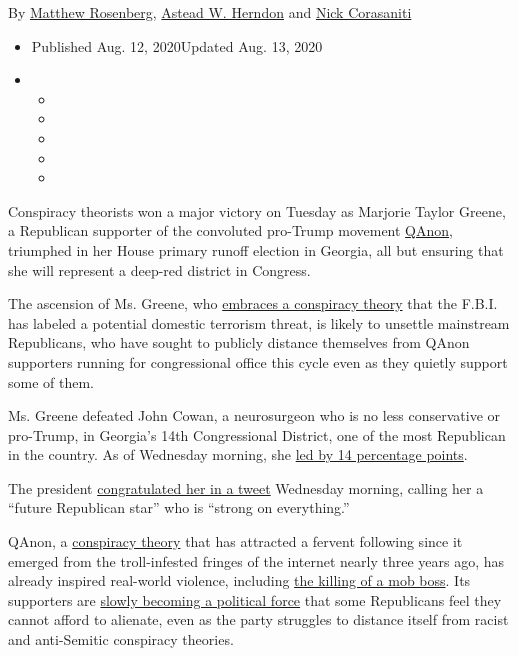 By
\href{https://www.nytimes3xbfgragh.onion/by/matthew-rosenberg}{Matthew
Rosenberg},
\href{https://www.nytimes3xbfgragh.onion/by/astead-w-herndon}{Astead W.
Herndon} and
\href{https://www.nytimes3xbfgragh.onion/by/nick-corasaniti}{Nick
Corasaniti}

\begin{itemize}
\item
  Published Aug. 12, 2020Updated Aug. 13, 2020
\item
  \begin{itemize}
  \item
  \item
  \item
  \item
  \item
  \end{itemize}
\end{itemize}

Conspiracy theorists won a major victory on Tuesday as Marjorie Taylor
Greene, a Republican supporter of the convoluted pro-Trump movement
\href{https://www.nytimes3xbfgragh.onion/2020/08/13/technology/qanon-tea-party.html}{QAnon},
triumphed in her House primary runoff election in Georgia, all but
ensuring that she will represent a deep-red district in Congress.

The ascension of Ms. Greene, who
\href{https://www.nytimes3xbfgragh.onion/2020/07/14/us/politics/qanon-politicians-candidates.html}{embraces
a conspiracy theory} that the F.B.I. has labeled a potential domestic
terrorism threat, is likely to unsettle mainstream Republicans, who have
sought to publicly distance themselves from QAnon supporters running for
congressional office this cycle even as they quietly support some of
them.

Ms. Greene defeated John Cowan, a neurosurgeon who is no less
conservative or pro-Trump, in Georgia's 14th Congressional District, one
of the most Republican in the country. As of Wednesday morning, she
\href{https://www.nytimes3xbfgragh.onion/interactive/2020/08/11/us/elections/results-connecticut-georgia-minnesota-wisconsin-primaries.html?action=click\&pgtype=Article\&state=default\&module=styln-elections-2020\&region=TOP_BANNER\&context=storylines_menu}{led
by 14 percentage points}.

The president
\href{https://twitter.com/realDonaldTrump/status/1293525010523578375}{congratulated
her in a tweet} Wednesday morning, calling her a ``future Republican
star'' who is ``strong on everything.''

QAnon, a
\href{https://www.nytimes3xbfgragh.onion/2018/08/01/us/politics/what-is-qanon.html}{conspiracy
theory} that has attracted a fervent following since it emerged from the
troll-infested fringes of the internet nearly three years ago, has
already inspired real-world violence, including
\href{https://www.nytimes3xbfgragh.onion/2019/07/21/nyregion/gambino-shooting-anthony-comello-frank-cali.html}{the
killing of a mob boss}. Its supporters are
\href{https://www.nytimes3xbfgragh.onion/2020/07/14/us/politics/qanon-politicians-candidates.html}{slowly
becoming a political force} that some Republicans feel they cannot
afford to alienate, even as the party struggles to distance itself from
racist and anti-Semitic conspiracy theories.

